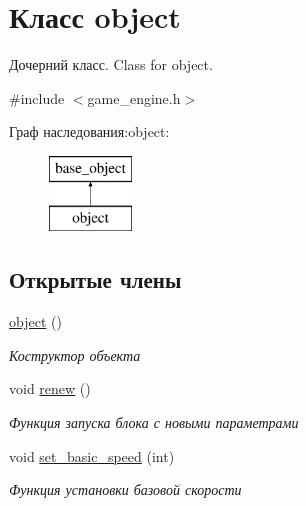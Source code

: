 \hypertarget{classobject}{}\section{Класс object}
\label{classobject}


Дочерний класс. Class for object.  




{\ttfamily \#include $<$game\+\_\+engine.\+h$>$}

Граф наследования\+:object\+:\begin{figure}[H]
\begin{center}
\leavevmode
\includegraphics[height=2.000000cm]{classobject}
\end{center}
\end{figure}
\subsection*{Открытые члены}
\begin{DoxyCompactItemize}
\item 
\mbox{\label{classobject_a04aad740887b47c735b9ed9078e45d77}} 
\mbox{\hyperlink{classobject_a04aad740887b47c735b9ed9078e45d77}{object}} ()
\begin{DoxyCompactList}\small\item\em Коструктор объекта \end{DoxyCompactList}\item 
\mbox{\label{classobject_a2fe455d0f7b85018d2984888cbef18b8}} 
void \mbox{\hyperlink{classobject_a2fe455d0f7b85018d2984888cbef18b8}{renew}} ()
\begin{DoxyCompactList}\small\item\em Функция запуска блока с новыми параметрами \end{DoxyCompactList}\item 
void \mbox{\hyperlink{classobject_a8a93112d56c32430e1eb5560d2db6912}{set\+\_\+basic\+\_\+speed}} (int)
\begin{DoxyCompactList}\small\item\em Функция установки базовой скорости \end{DoxyCompactList}\end{DoxyCompactItemize}
